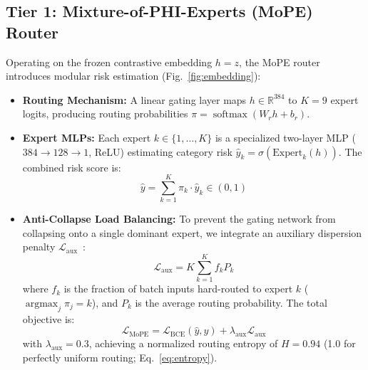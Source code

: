 \documentclass[lettersize,journal]{IEEEtran}
\begin{document}
\subsection{Tier 1: Mixture-of-PHI-Experts (MoPE) Router}
Operating on the frozen contrastive embedding $h = z$, the MoPE router introduces modular risk estimation (Fig.~\ref{fig:embedding}):
\begin{itemize}
    \item \textbf{Routing Mechanism:} A linear gating layer maps $h \in \mathbb{R}^{384}$ to $K=9$ expert logits, producing routing probabilities $\pi = \operatorname{softmax}(W_r h + b_r)$.
    \item \textbf{Expert MLPs:} Each expert $k \in \{1, \dots, K\}$ is a specialized two-layer MLP ($384 \rightarrow 128 \rightarrow 1$, ReLU) estimating category risk $\hat{y}_k = \sigma(\mathrm{Expert}_k(h))$. The combined risk score is:
    \begin{equation}
    \hat{y} = \sum_{k=1}^K \pi_k \cdot \hat{y}_k \in (0, 1)
    \label{eq:mope_risk}
    \end{equation}
    \item \textbf{Anti-Collapse Load Balancing:} To prevent the gating network from collapsing onto a single dominant expert, we integrate an auxiliary dispersion penalty $\mathcal{L}_{\mathrm{aux}}$~\cite{fedus2022}:
    \begin{equation}
    \mathcal{L}_{\mathrm{aux}} = K \sum_{k=1}^K f_k P_k
    \label{eq:aux}
    \end{equation}
    where $f_k$ is the fraction of batch inputs hard-routed to expert $k$ ($\operatorname{argmax}_j \pi_j = k$), and $P_k$ is the average routing probability. The total objective is:
    \begin{equation}
    \mathcal{L}_{\mathrm{MoPE}} = \mathcal{L}_{\mathrm{BCE}}(\hat{y}, y) + \lambda_{\mathrm{aux}}\mathcal{L}_{\mathrm{aux}}
    \label{eq:mope_loss}
    \end{equation}
    with $\lambda_{\mathrm{aux}} = 0.3$, achieving a normalized routing entropy of $H = 0.94$ (1.0 for perfectly uniform routing; Eq.~\ref{eq:entropy}).
\end{itemize}
\end{document}
